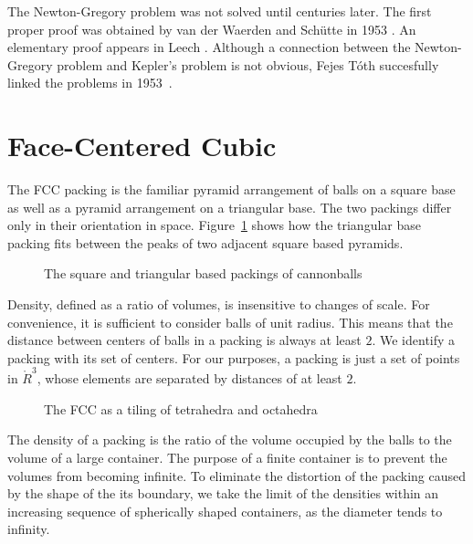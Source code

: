 The Newton-Gregory problem was not solved until centuries later.
The first proper proof was obtained by van der Waerden and
Sch\"utte in 1953 \cite{Sch53}.  An elementary proof appears in Leech
\cite{Leech:1956:MG}.  Although a connection between the Newton-Gregory
problem and Kepler's problem is not obvious, Fejes T\'oth succesfully linked the
problems in 1953~\cite{Fej53}.


\section{Face-Centered Cubic}



The FCC packing is the familiar pyramid arrangement of
balls on a square base as well as a pyramid arrangement on a
triangular base.  The two packings
differ only in their orientation in space.
Figure~\ref{fig:tri-square-cannonballs} shows how the triangular base
packing fits between the peaks of two adjacent square based pyramids.

\begin{figure}[htb]
  \centering
  \caption{The square and triangular based packings of cannonballs}
  \label{fig:tri-square-cannonballs}
\end{figure}

Density, defined as a ratio of volumes, is insensitive to changes of
scale.  For convenience, it is sufficient to consider balls of unit
radius. This means that the distance between centers of balls in a
packing is always  at least $2$.  We identify a packing with its set
of centers.   For our purposes, a packing is just a set of points
in $\ring{R}^3$, whose elements are separated by distances of at least
$2$.


\begin{figure}[htb]
  \centering
  \caption{The FCC as a tiling of tetrahedra and octahedra}
  \label{fig:tet-oct}
\end{figure}

The density of a packing is the ratio of the volume occupied by the
balls to the volume of a large container.  The
purpose of a finite container is to prevent the volumes from becoming
infinite.  To eliminate the distortion of the packing caused by the
shape of the its boundary, we take the limit of the densities within an increasing
sequence of spherically shaped containers, as the diameter tends to infinity.

